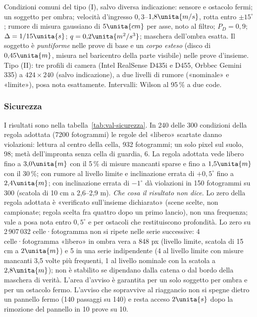 Condizioni comuni del tipo (I), salvo diversa indicazione: sensore e ostacolo fermi; un soggetto per ombra; velocità d'ingresso $0{,}3$–$1{,}8\unita{m/s}$, rotta entro $\pm15^\circ$; rumore di misura gaussiano di $5\unita{cm}$ per asse, noto al filtro; $P_D=0{,}9$; $\Delta=1/15\unita{s}$; $q=0{,}2\unita{m^2/s^3}$; maschera dell'ombra esatta. Il soggetto è \emph{puntiforme} nelle prove di base e un \emph{corpo esteso} (disco di $0{,}45\unita{m}$, misura nel baricentro della parte visibile) nelle prove d'insieme. Tipo (II): tre profili di camera (Intel RealSense D435i e D455, Orbbec Gemini 335) a $424\times240$ (salvo indicazione), a due livelli di rumore («nominale» e «limite»), posa nota esattamente. Intervalli: Wilson al 95\,\% a due code.

\subsubsection*{Sicurezza}

I risultati sono nella tabella~\ref{tab:val-sicurezza}. In 240 delle 300 condizioni della regola adottata (7200 fotogrammi) le regole del «libero» scartate danno violazioni: lettura al centro della cella, 932 fotogrammi; un solo pixel sul suolo, 98; metà dell'impronta senza cella di guardia, 6. La regola adottata vede libero fino a $3{,}0\unita{m}$ con il 5\,\% di misure mancanti sparse e fino a $1{,}5\unita{m}$ con il 30\,\%; con rumore al livello limite e inclinazione errata di $+0{,}5^\circ$ fino a $2{,}4\unita{m}$; con inclinazione errata di $-1^\circ$ dà violazioni in 150 fotogrammi su 300 (scatola di 10 cm a 2,6–2,9 m). \emph{Che cosa il risultato non dice.} Lo zero della regola adottata è «verificato sull'insieme dichiarato» (scene scelte, non campionate; regola scelta fra quattro dopo un primo lancio), non una frequenza; vale a posa nota entro $0{,}5^\circ$ e per ostacoli che restituiscono profondità. Lo zero su 2\,907\,032 celle·fotogramma non si ripete nelle serie successive: 4 celle·fotogramma «libero» in ombra vera a 848 px (livello limite, scatola di 15 cm a $2\unita{m}$) e 5 in una serie indipendente (4 al livello limite con misure mancanti 3,5 volte più frequenti, 1 al livello nominale con la scatola a $2{,}8\unita{m}$); non è stabilito se dipendano dalla catena o dal bordo della maschera di verità. L'area d'avviso è garantita per un solo soggetto per ombra e per un ostacolo fermo. L'avviso che sopravvive al riaggancio non si spegne dietro un pannello fermo (140 passaggi su 140) e resta acceso $2\unita{s}$ dopo la rimozione del pannello in 10 prove su 10.

